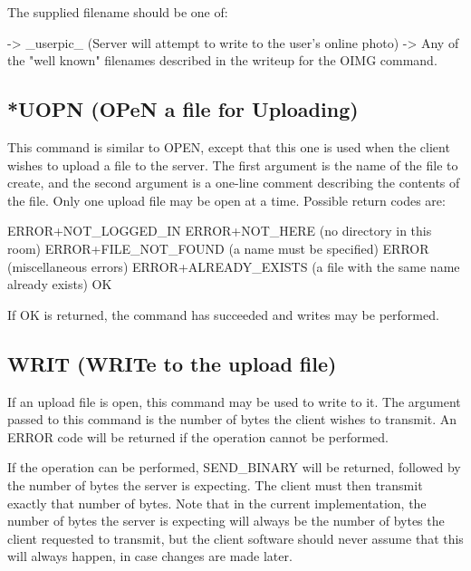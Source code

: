 The supplied filename should be one of:

 ->  _userpic_   (Server will attempt to write to the user's online photo)
 ->  Any of the "well known" filenames described in the writeup for the
     OIMG command.



\subsection{*UOPN (OPeN a file for Uploading)}

 This command is similar to OPEN, except that this one is used when the
client wishes to upload a file to the server.  The first argument is the name
of the file to create, and the second argument is a one-line comment
describing the contents of the file.  Only one upload file may be open at a
time.  Possible return codes are:

 ERROR+NOT_LOGGED_IN
 ERROR+NOT_HERE               (no directory in this room)
 ERROR+FILE_NOT_FOUND         (a name must be specified)
 ERROR                        (miscellaneous errors)
 ERROR+ALREADY_EXISTS         (a file with the same name already exists)
 OK

 If OK is returned, the command has succeeded and writes may be performed.



\subsection{WRIT (WRITe to the upload file)}

 If an upload file is open, this command may be used to write to it.  The
argument passed to this command is the number of bytes the client wishes to
transmit.  An ERROR code will be returned if the operation cannot be
performed.

 If the operation can be performed, SEND_BINARY will be returned, followed
by the number of bytes the server is expecting.  The client must then transmit
exactly that number of bytes.  Note that in the current implementation, the
number of bytes the server is expecting will always be the number of bytes
the client requested to transmit, but the client software should never assume
that this will always happen, in case changes are made later.



